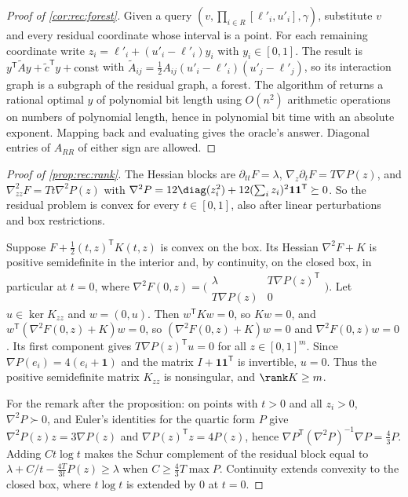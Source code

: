 \begin{proof}[Proof of \cref{cor:rec:forest}]
Given a query $(v,\prod_{i\in R}[\ell'_i,u'_i],\gamma)$, substitute $v$ and
every residual coordinate whose interval is a point. For each remaining
coordinate write $z_i=\ell'_i+(u'_i-\ell'_i)y_i$ with $y_i\in[0,1]$. The
result is $y^{\mathsf T}\tilde Ay+\tilde c^{\mathsf T}y+\text{const}$ with
$\tilde A_{ij}=\frac12A_{ij}(u'_i-\ell'_i)(u'_j-\ell'_j)$, so its interaction
graph is a subgraph of the residual graph, a forest. The algorithm of
\citet[Theorem~1 and Lemma~19]{pia2026-treewidth-and-the-complexity-of} returns a rational
optimal $y$ of polynomial bit length using $O(n^2)$ arithmetic operations on
numbers of polynomial length, hence in polynomial bit time with an absolute
exponent. Mapping back and evaluating gives the oracle's answer. Diagonal
entries of $A_{RR}$ of either sign are allowed.
\end{proof}

\begin{proof}[Proof of \cref{prop:rec:rank}]
The Hessian blocks are $\partial_{tt}F=\lambda$,
$\nabla_z\partial_tF=T\nabla P(z)$, and $\nabla^2_{zz}F=Tt\nabla^2P(z)$ with
$\nabla^2P=12\diag(z_i^2)+12(\sum_iz_i)^2\mathbf1\mathbf1^{\mathsf T}\succeq0$.
So the residual problem is convex for every $t\in[0,1]$, also after linear
perturbations and box restrictions.

Suppose $F+\frac12(t,z)^{\mathsf T}K(t,z)$ is convex on the box. Its Hessian
$\nabla^2F+K$ is positive semidefinite in the interior and, by continuity, on
the closed box, in particular at $t=0$, where
$\nabla^2F(0,z)=\bigl(\begin{smallmatrix}\lambda&T\nabla P(z)^{\mathsf T}\\
T\nabla P(z)&0\end{smallmatrix}\bigr)$. Let $u\in\ker K_{zz}$ and $w=(0,u)$.
Then $w^{\mathsf T}Kw=0$, so $Kw=0$, and
$w^{\mathsf T}(\nabla^2F(0,z)+K)w=0$, so $(\nabla^2F(0,z)+K)w=0$ and
$\nabla^2F(0,z)w=0$. Its first component gives $T\nabla P(z)^{\mathsf T}u=0$
for all $z\in[0,1]^m$. Since $\nabla P(e_i)=4(e_i+\mathbf1)$ and the matrix
$I+\mathbf1\mathbf1^{\mathsf T}$ is invertible, $u=0$. Thus the positive
semidefinite matrix $K_{zz}$ is nonsingular, and $\rank K\ge m$.

For the remark after the proposition: on points with $t>0$ and all $z_i>0$,
$\nabla^2P\succ0$, and Euler's identities for the quartic form $P$ give
$\nabla^2P(z)z=3\nabla P(z)$ and $\nabla P(z)^{\mathsf T}z=4P(z)$, hence
$\nabla P^{\mathsf T}(\nabla^2P)^{-1}\nabla P=\frac43P$. Adding $Ct\log t$ makes
the Schur complement of the residual block equal to
$\lambda+C/t-\frac{4T}{3t}P(z)\ge\lambda$ when $C\ge\frac43T\max P$. Continuity
extends convexity to the closed box, where $t\log t$ is extended by $0$ at
$t=0$.
\end{proof}

